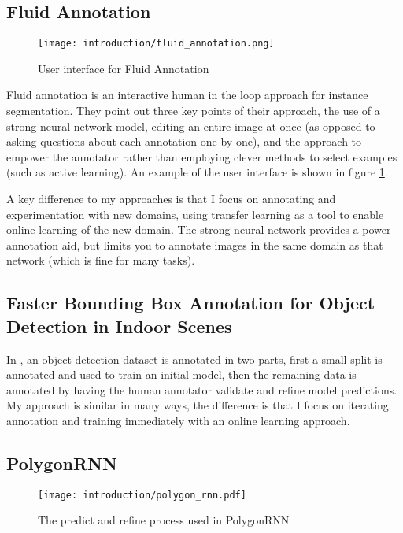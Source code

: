 \subsection{Fluid Annotation \cite{Andriluka2018}}
\begin{figure}[h]
  \centering
  \texttt{[image: introduction/fluid\_annotation.png]}
  \caption{User interface for Fluid Annotation \cite{Andriluka2018}}  
  \label{fig:fluid_annotation}
\end{figure}

Fluid annotation is an interactive human in the loop approach for instance segmentation. They point out three key points of their approach, the use of a strong neural network model, editing an entire image at once (as opposed to asking questions about each annotation one by one), and the approach to empower the annotator rather than employing clever methods to select examples (such as active learning). An example of the user interface is shown in figure \ref{fig:fluid_annotation}.

A key difference to my approaches is that I focus on annotating and experimentation with new domains, using transfer learning as a tool to enable online learning of the new domain. The strong neural network provides a power annotation aid, but limits you to annotate images in the same domain as that network (which is fine for many tasks).

\subsection{Faster Bounding Box Annotation for Object Detection in Indoor Scenes}
In \cite{Adhikaria2018}, an object detection dataset is annotated in two parts, first a small split is annotated and used to train an initial model, then the remaining data is annotated by having the human annotator validate and refine model predictions. My approach is similar in many ways, the difference is that I focus on iterating annotation and training immediately with an online learning approach.

\subsection {PolygonRNN}

\begin{figure}[h]
  \centering
  \texttt{[image: introduction/polygon\_rnn.pdf]}
  \caption{The predict and refine process used in PolygonRNN \cite{Castrejon2017}}  
  \label{fig:polygon_rnn}
\end{figure}


